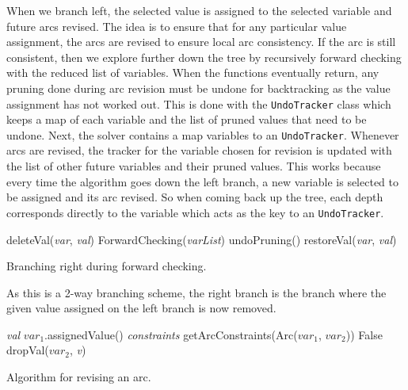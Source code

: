 \documentclass{article}
\begin{document}
When we branch left, the selected value is assigned to the selected variable and future arcs revised. The idea is to ensure that for any particular value assignment, the arcs are revised to ensure local arc consistency. If the arc is still consistent, then we explore further down the tree by recursively forward checking with the reduced list of variables. 
\n
When the functions eventually return, any pruning done during arc revision must be undone for backtracking as the value assignment has not worked out. This is done with the \texttt{UndoTracker} class which keeps a map of each variable and the list of pruned values that need to be undone. Next, the solver contains a map variables to an \texttt{UndoTracker}. Whenever arcs are revised, the tracker for the variable chosen for revision is updated with the list of other future variables and their pruned values. This works because every time the algorithm goes down the left branch, a new variable is selected to be assigned and its arc revised. So when coming back up the tree, each depth corresponds directly to the variable which acts as the key to an \texttt{UndoTracker}. 

\begin{algorithm}[H]
\begin{algorithmic}[1]
\State deleteVal(\textit{var}, \textit{val})
		\State ForwardChecking(\textit{varList})
	\EndIf
	\State undoPruning()
\EndIf
\State restoreVal(\textit{var}, \textit{val})
\EndProcedure
\end{algorithmic}
\caption{Branching right during forward checking.}
\end{algorithm}
As this is a 2-way branching scheme, the right branch is the branch where the given value assigned on the left branch is now removed.

\begin{algorithm}[H]
\begin{algorithmic}[1]
\State \textit{val} \gets $var_1$.assignedValue()
\State \textit{constraints} \gets getArcConstraints(Arc($var_1$, $var_2$))
	\Return False
\Else
				dropVal($var_2$, \textit{v})
			\EndIf
		\EndFor
	\EndFor
\EndIf
\EndProcedure
\end{algorithmic}
\caption{Algorithm for revising an arc.}
\end{algorithm}
\end{document}
